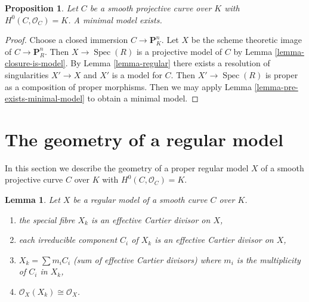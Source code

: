 \documentclass{stacks-project}
\theoremstyle{plain}
\newtheorem{proposition}[subsection]{Proposition}
\newtheorem{lemma}[subsection]{Lemma}
\theoremstyle{definition}
\theoremstyle{remark}
\numberwithin{equation}{subsection}
\def\Spec{\mathop{\mathrm{Spec}}}
\begin{document}
\begin{proposition}
\label{proposition-exists-minimal-model}
Let $C$ be a smooth projective curve over $K$ with
$H^0(C, \mathcal{O}_C) = K$. A minimal model exists.
\end{proposition}

\begin{proof}
Choose a closed immersion $C \to \mathbf{P}^n_K$. Let
$X$ be the scheme theoretic image of $C \to \mathbf{P}^n_R$.
Then $X \to \Spec(R)$ is a projective model of $C$ by
Lemma \ref{lemma-closure-is-model}.
By Lemma \ref{lemma-regular} there exists a resolution
of singularities $X' \to X$ and $X'$ is a model for $C$.
Then $X' \to \Spec(R)$ is proper as a composition of proper morphisms.
Then we may apply Lemma \ref{lemma-pre-exists-minimal-model}
to obtain a minimal model.
\end{proof}





\section{The geometry of a regular model}
\label{section-special-fibre}

\noindent
In this section we describe the geometry of a proper regular model $X$ of a
smooth projective curve $C$ over $K$ with $H^0(C, \mathcal{O}_C) = K$.

\begin{lemma}
\label{lemma-divisor-special-fiber}
Let $X$ be a regular model of a smooth curve $C$ over $K$.
\begin{enumerate}
\item the special fibre $X_k$ is an effective Cartier divisor on $X$,
\item each irreducible component $C_i$ of $X_k$ is an effective
Cartier divisor on $X$,
\item $X_k = \sum m_i C_i$ (sum of effective Cartier divisors)
where $m_i$ is the multiplicity of $C_i$ in $X_k$,
\item $\mathcal{O}_X(X_k) \cong \mathcal{O}_X$.
\end{enumerate}
\end{lemma}
\end{document}
